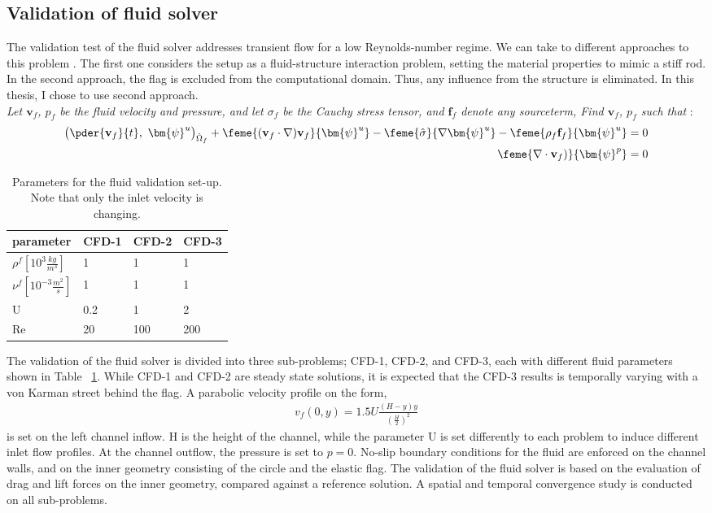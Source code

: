 \subsection{Validation of fluid solver}
The validation test of the fluid solver addresses transient flow for a low Reynolds-number regime. 
We can take to different approaches to this problem \cite{Hron2006}. The first one considers the setup as a fluid-structure interaction problem, setting the material properties to mimic a stiff rod. In the second approach, the flag is excluded from the computational domain. Thus, any influence from the structure is eliminated. In this thesis, I chose to use second approach.  \\
\textit{Let $\mathbf{v}_f$, ${p}_f$ be the fluid velocity and pressure, and let  $\sigma_f$ be the Cauchy stress tensor, and $\mathbf{f}_f$ denote any sourceterm,  Find $\mathbf{v}_f$, ${p}_f$ such that }:
\begin{align*}
 \big( \pder{\mathbf{v}_f}{t}, \ \bm{\psi}^u \big)_{\hat{\Omega}_f} +
\feme{(\mathbf{v}_f \cdot \nabla) \mathbf{v}_f}{\bm{\psi}^u}
- \feme{\hat{\sigma}}{\nabla\bm{\psi}^u} -
\feme{\rho_f  \mathbf{f}_f}{{\bm{\psi}^u}} = 0 \\
\feme{\nabla \cdot \mathbf{v}_f)}{\bm{\psi}^p} = 0 
\end{align*} 
\newpage
\begin{table}[h!]
\centering
\begin{tabular}{ |p{3cm}||p{2cm}|p{2cm}|p{2cm}|  }
\hline
 parameter              & CFD-1 & CFD-2 & CFD-3 \\
 \hline
$\rho^f [10^{3}\frac{kg}{m^3}]$ & 1    & 1    & 1    \\
$\nu^f  [10^{-3}\frac{m^2}{s}]$  & 1    & 1    & 1    \\
U                      & 0.2  & 1    & 2    \\
Re                     & 20   & 100  & 200 \\
\hline
\end{tabular}
\caption{Parameters for the fluid validation set-up. Note that only the inlet velocity is changing.}
\label{sec:cfdparam}
\end{table}
The validation of the fluid solver is divided into three sub-problems; CFD-1, CFD-2, and CFD-3, each with different fluid parameters shown in Table ~\ref{sec:cfdparam}. While CFD-1 and CFD-2 are steady state solutions, it is expected that the CFD-3 results is temporally varying with a von Karman street behind the flag. A parabolic velocity profile on the form,
\begin{align*}
v_f(0, y) = 1.5 U\frac{(H -y)y}{(\frac{H}{2})^2}
\end{align*}
is set on the left channel inflow. H is the height of the channel, while the parameter U is set differently to each problem to induce different inlet flow profiles. At the channel outflow, the pressure is set to $p = 0$. No-slip boundary conditions for the fluid are enforced on the channel walls, and on the inner geometry consisting of the circle and the elastic flag. The validation of the fluid solver is based on the evaluation of drag and lift forces on the inner geometry, compared against a reference solution. A spatial and temporal convergence study is conducted on all sub-problems. 
